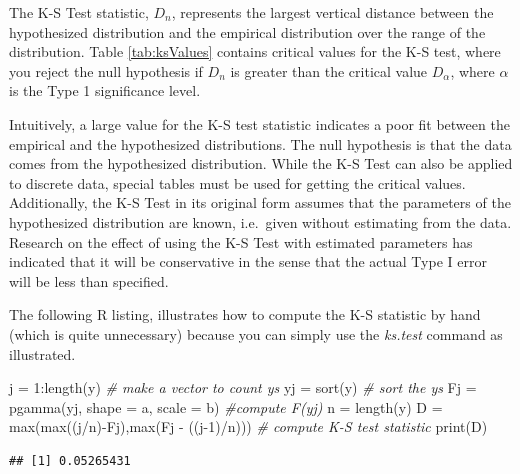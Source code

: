 \documentclass[
]{book}
\newenvironment{Shaded}{\begin{snugshade}}{\end{snugshade}}
\newcommand{\AttributeTok}[1]{\textcolor[rgb]{0.77,0.63,0.00}{#1}}
\newcommand{\CommentTok}[1]{\textcolor[rgb]{0.56,0.35,0.01}{\textit{#1}}}
\newcommand{\DecValTok}[1]{\textcolor[rgb]{0.00,0.00,0.81}{#1}}
\newcommand{\FunctionTok}[1]{\textcolor[rgb]{0.00,0.00,0.00}{#1}}
\newcommand{\NormalTok}[1]{#1}
\newcommand{\OtherTok}[1]{\textcolor[rgb]{0.56,0.35,0.01}{#1}}
\newcommand{\SpecialCharTok}[1]{\textcolor[rgb]{0.00,0.00,0.00}{#1}}
\theoremstyle{definition}
\theoremstyle{definition}
\theoremstyle{definition}
\theoremstyle{definition}
\theoremstyle{remark}
\begin{document}
The K-S Test statistic, \(D_{n}\), represents the largest vertical
distance between the hypothesized distribution and the empirical
distribution over the range of the distribution.
Table \ref{tab:ksValues} contains critical values for the K-S test, where you reject the null
hypothesis if \(D_{n}\) is greater than the critical value \(D_{\alpha}\),
where \(\alpha\) is the Type 1 significance level.

Intuitively, a large value for the K-S test statistic indicates a poor
fit between the empirical and the hypothesized distributions. The null
hypothesis is that the data comes from the hypothesized distribution.
While the K-S Test can also be applied to discrete data, special tables
must be used for getting the critical values. Additionally, the K-S Test
in its original form assumes that the parameters of the hypothesized
distribution are known, i.e.~given without estimating from the data.
Research on the effect of using the K-S Test with estimated parameters
has indicated that it will be conservative in the sense that the actual
Type I error will be less than specified.

The following R listing, illustrates how to compute the K-S statistic by
hand (which is quite unnecessary) because you can simply use the
\emph{ks.test} command as illustrated.

\begin{Shaded}
\begin{Highlighting}[]
\NormalTok{j }\OtherTok{=} \DecValTok{1}\SpecialCharTok{:}\FunctionTok{length}\NormalTok{(y) }\CommentTok{\# make a vector to count y\textquotesingle{}s}
\NormalTok{yj }\OtherTok{=} \FunctionTok{sort}\NormalTok{(y) }\CommentTok{\# sort the y\textquotesingle{}s}
\NormalTok{Fj }\OtherTok{=} \FunctionTok{pgamma}\NormalTok{(yj, }\AttributeTok{shape =}\NormalTok{ a, }\AttributeTok{scale =}\NormalTok{ b)  }\CommentTok{\#compute F(yj)}
\NormalTok{n }\OtherTok{=} \FunctionTok{length}\NormalTok{(y)}
\NormalTok{D }\OtherTok{=} \FunctionTok{max}\NormalTok{(}\FunctionTok{max}\NormalTok{((j}\SpecialCharTok{/}\NormalTok{n)}\SpecialCharTok{{-}}\NormalTok{Fj),}\FunctionTok{max}\NormalTok{(Fj }\SpecialCharTok{{-}}\NormalTok{ ((j}\DecValTok{{-}1}\NormalTok{)}\SpecialCharTok{/}\NormalTok{n))) }\CommentTok{\# compute K{-}S test statistic}
\FunctionTok{print}\NormalTok{(D)}
\end{Highlighting}
\end{Shaded}

\begin{verbatim}
## [1] 0.05265431
\end{verbatim}
\end{document}
